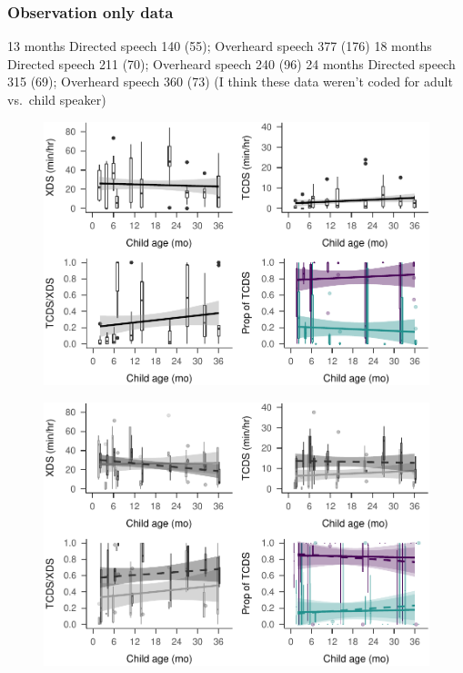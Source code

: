 \documentclass[man]{apa6}
\theoremstyle{definition}
\theoremstyle{definition}
\theoremstyle{definition}
\theoremstyle{remark}
\begin{document}
\subsubsection{Observation only data}\label{observation-only-data}

13 months Directed speech 140 (55); Overheard speech 377 (176) 18 months
Directed speech 211 (70); Overheard speech 240 (96) 24 months Directed
speech 315 (69); Overheard speech 360 (73) (I think these data weren't
coded for adult vs.~child speaker)

\begin{figure}
\centering
\includegraphics{Tseltal-CLE_files/figure-latex/plot_XDS_TDS_quantity_random-1.pdf}
\caption{}
\end{figure}

\begin{figure}
\centering
\includegraphics{Tseltal-CLE_files/figure-latex/plot_XDS_TDS_quantity_nonrandom-1.pdf}
\caption{}
\end{figure}
\end{document}
